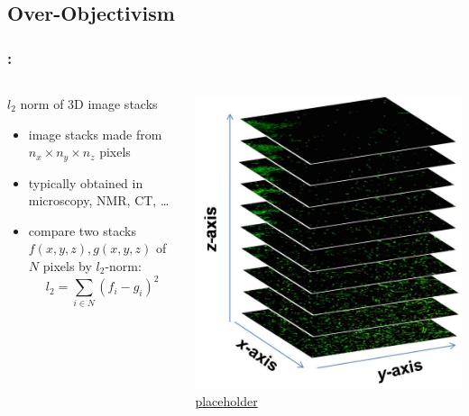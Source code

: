 \documentclass[9pt,xcolor=table]{beamer}
\begin{document}
\subsection{Over-Objectivism}
\begin{frame}
\frametitle{\insertsectionhead{}: \insertsubsectionhead{}}
\begin{columns}[c]
    \begin{column}{.45\textwidth}
      \begin{block}{$l_2$ norm of 3D image stacks}
        \begin{itemize}
        \item image stacks made from $n_x \times n_y \times n_z$ pixels
        \item typically obtained in microscopy, NMR, CT, \dots
        \item compare two stacks $f(x,y,z),g(x,y,z)$ of $N$ pixels by $l_2$-norm:\\
          $$ l_2 = \sum_{i \in N} (f_i - g_i)^2 $$
        \end{itemize}
      \end{block}
    \end{column}
    \begin{column}{.45\textwidth}
      \begin{center}
      \includegraphics[width=\textwidth]{img/image_stack}\\[6pt]
      \small\href{http://bioimagel.com/3-d_operations}{placeholder}
    \end{center}
    \end{column}
  \end{columns}
\end{frame}
\end{document}
